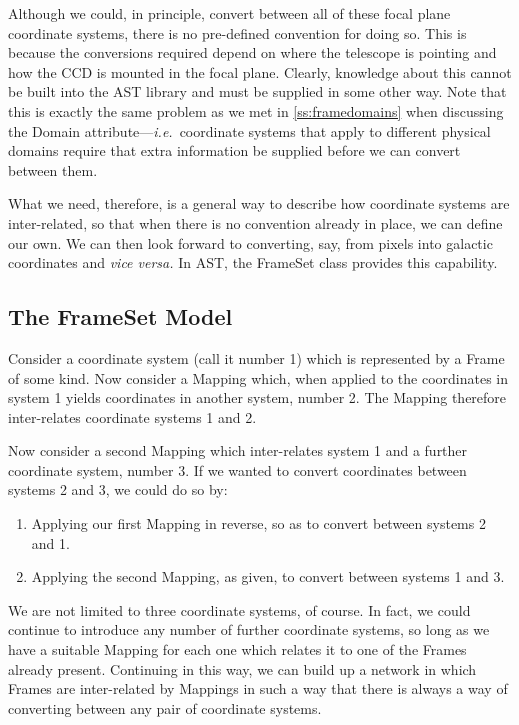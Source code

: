 \documentclass[twoside,11pt]{article}
\newcommand{\secref}[1]{\S\ref{#1}}
\renewcommand{\secref}[1]{\ref{#1}}
\begin{document}
Although we could, in principle, convert between all of these focal
plane coordinate systems, there is no pre-defined convention for doing
so. This is because the conversions required depend on where the
telescope is pointing and how the CCD is mounted in the focal
plane. Clearly, knowledge about this cannot be built into the AST
library and must be supplied in some other way. Note that this is
exactly the same problem as we met in \secref{ss:framedomains} when
discussing the Domain attribute---{\em{i.e.}}\ coordinate systems that
apply to different physical domains require that extra information be
supplied before we can convert between them.

What we need, therefore, is a general way to describe how coordinate
systems are inter-related, so that when there is no convention already
in place, we can define our own. We can then look forward to
converting, say, from pixels into galactic coordinates and {\em{vice
versa.}}  In AST, the FrameSet class provides this capability.

\subsection{The FrameSet Model}

Consider a coordinate system (call it number 1) which is represented
by a Frame of some kind. Now consider a Mapping which, when applied to
the coordinates in system 1 yields coordinates in another system,
number 2. The Mapping therefore inter-relates coordinate systems 1 and
2.

Now consider a second Mapping which inter-relates system 1 and a
further coordinate system, number 3. If we wanted to convert
coordinates between systems 2 and 3, we could do so by:

\begin{enumerate}
\item Applying our first Mapping in reverse, so as to convert between
systems 2 and 1.

\item Applying the second Mapping, as given, to convert between
systems 1 and 3.
\end{enumerate}

We are not limited to three coordinate systems, of course. In fact, we
could continue to introduce any number of further coordinate systems,
so long as we have a suitable Mapping for each one which relates it to
one of the Frames already present. Continuing in this way, we can
build up a network in which Frames are inter-related by Mappings in
such a way that there is always a way of converting between any pair
of coordinate systems.
\end{document}
